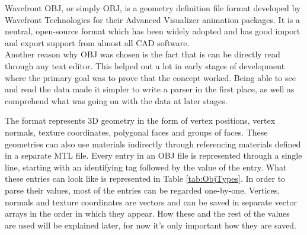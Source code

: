 Wavefront OBJ, or simply OBJ, is a geometry definition file format developed by Wavefront Technologies for their Advanced Visualizer animation packages\cite{bib:OBJ}. It is a neutral, open-source format which has been widely adopted and has good import and export support from almost all \acs{CAD} software.\\
Another reason why OBJ was chosen is the fact that is can be directly read through any text editor. This helped out a lot in early stages of development where the primary goal was to prove that the concept worked. Being able to see and read the data made it simpler to write a parser in the first place, as well as comprehend what was going on with the data at later stages.\\
\begin{table}[htbp]
	\centering 
	\caption[ObjTypes]{Relevant types in OBJ format}
	\label{tab:ObjTypes}
\end{table}
The format represents 3D geometry in the form of vertex positions, vertex normals, texture coordinates, polygonal faces and groups of faces. These geometries can also use materials indirectly through referencing materials defined in a separate \acs{MTL} file. Every entry in an OBJ file is represented through a single line, starting with an identifying tag followed by the value of the entry. What these entries can look like is represented in Table \ref{tab:ObjTypes}.
In order to parse their values, most of the entries can be regarded one-by-one. Vertices, normals and texture coordinates are vectors and can be saved in separate vector arrays in the order in which they appear. How these and the rest of the values are used will be explained later, for now it's only important how they are saved.\\
